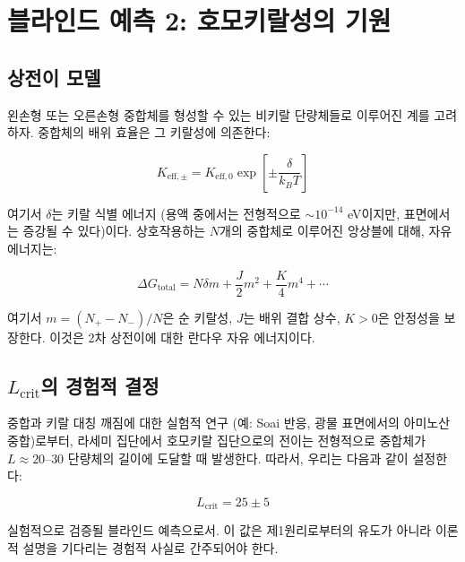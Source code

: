\documentclass[12pt,a4paper]{article}
\begin{document}
	\section{블라인드 예측 2: 호모키랄성의 기원}
	\label{sec:chirality}
	
	\subsection{상전이 모델}
	
	왼손형 또는 오른손형 중합체를 형성할 수 있는 비키랄 단량체들로 이루어진 계를 고려하자. 중합체의 배위 효율은 그 키랄성에 의존한다:
	
	\begin{equation}
		K_{\mathrm{eff},\pm} = K_{\mathrm{eff},0} \exp\left[\pm \frac{\delta}{k_B T}\right]
		\label{eq:keff-chiral}
	\end{equation}
	
	여기서 $\delta$는 키랄 식별 에너지 (용액 중에서는 전형적으로 $\sim 10^{-14}$ eV이지만, 표면에서는 증강될 수 있다)이다. 상호작용하는 $N$개의 중합체로 이루어진 앙상블에 대해, 자유 에너지는:
	
	\begin{equation}
		\Delta G_{\text{total}} = N \delta m + \frac{J}{2} m^2 + \frac{K}{4} m^4 + \cdots
		\label{eq:chiral-free}
	\end{equation}
	
	여기서 $m = (N_+ - N_-)/N$은 순 키랄성, $J$는 배위 결합 상수, $K > 0$은 안정성을 보장한다. 이것은 2차 상전이에 대한 란다우 자유 에너지이다.
	
	\subsection{$L_{\text{crit}}$의 경험적 결정}
	
	중합과 키랄 대칭 깨짐에 대한 실험적 연구 (예: Soai 반응, 광물 표면에서의 아미노산 중합)로부터, 라세미 집단에서 호모키랄 집단으로의 전이는 전형적으로 중합체가 $L \approx 20$--$30$ 단량체의 길이에 도달할 때 발생한다. 따라서, 우리는 다음과 같이 설정한다:
	
	\begin{equation}
		\boxed{L_{\text{crit}} = 25 \pm 5}
		\label{eq:Lcrit-empirical}
	\end{equation}
	
	실험적으로 검증될 블라인드 예측으로서. 이 값은 제1원리로부터의 유도가 아니라 이론적 설명을 기다리는 경험적 사실로 간주되어야 한다.
	
\end{document}
